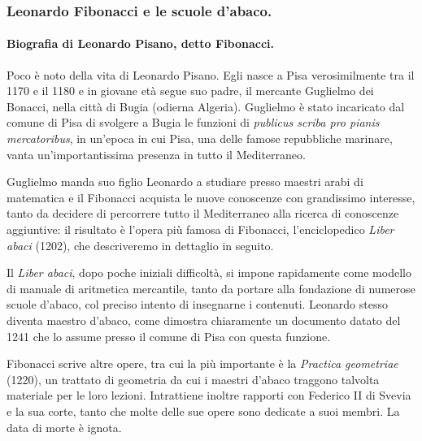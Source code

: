 \subsubsection{Leonardo Fibonacci e le scuole d'abaco.}\label{LeonardoFibonacciELeScuoleDAbaco}
\paragraph{Biografia di Leonardo Pisano, detto Fibonacci.} Poco \`e noto della vita di Leonardo Pisano. Egli nasce a Pisa verosimilmente tra il 1170 e il 1180 e in giovane et\`a segue suo padre, il mercante Guglielmo dei Bonacci, nella citt\`a di Bugia (odierna Algeria). Guglielmo \`e stato incaricato dal comune di Pisa di svolgere a Bugia le funzioni di \textit{publicus scriba pro pianis mercatoribus}, in un'epoca in cui Pisa, una delle famose repubbliche marinare, vanta un'importantissima presenza in tutto il Mediterraneo.
\par Guglielmo manda suo figlio Leonardo a studiare presso maestri arabi di matematica e il Fibonacci acquista le nuove conoscenze con grandissimo interesse, tanto da decidere di percorrere tutto il Mediterraneo alla ricerca di conoscenze aggiuntive: il risultato \`e l'opera pi\`u famosa di Fibonacci, l'enciclopedico \textit{Liber abaci} (1202), che descriveremo in dettaglio in seguito.
\par Il \textit{Liber abaci}, dopo poche iniziali difficolt\`a, si impone rapidamente come modello di manuale di aritmetica mercantile, tanto da portare alla fondazione di numerose scuole d'abaco, col preciso intento di insegnarne i contenuti. Leonardo stesso diventa maestro d'abaco, come dimostra chiaramente un documento datato del 1241 che lo assume presso il comune di Pisa con questa funzione.
\par Fibonacci scrive altre opere, tra cui la pi\`u importante \`e la \textit{Practica geometriae} (1220), un trattato di geometria da cui i maestri d'abaco traggono talvolta materiale per le loro lezioni. Intrattiene inoltre rapporti con Federico II di Svevia e la sua corte, tanto che molte delle sue opere sono dedicate a suoi membri. La data di morte \`e ignota.
